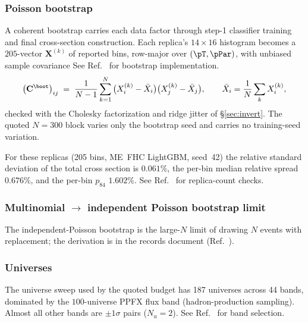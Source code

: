 \subsubsection{Poisson bootstrap}
\label{sec:bootstrap}
A coherent bootstrap carries each data factor through step-1 classifier training and final cross-section construction. Each replica's $14\times16$ histogram becomes a $205$-vector $\mathbf{X}^{(k)}$ of reported bins, row-major over $(\pT,\pPar)$, with unbiased sample covariance See Ref.~\cite{NoteRecords2026} for bootstrap implementation.
\begin{equation}
\big(\mathbf{C}^{\boot}\big)_{ij}
\;=\;
\frac{1}{N-1}\sum_{k=1}^{N}
\big(X_{i}^{(k)} - \bar X_{i}\big)\big(X_{j}^{(k)} - \bar X_{j}\big),
\qquad
\bar X_{i} = \frac{1}{N}\sum_{k} X_{i}^{(k)},
\label{eq:bootcov}
\end{equation}
checked with the Cholesky factorization and ridge jitter of \S\ref{sec:invert}. The quoted $N=300$ block varies only the bootstrap seed and carries no training-seed variation.

For these replicas (205 bins, ME~FHC LightGBM, seed~42) the relative standard deviation of the total cross section is $\boxed{0.061\%}$, the per-bin median relative spread $\boxed{0.676\%}$, and the per-bin $p_{84}$ $1.602\%$. See Ref.~\cite{NoteRecords2026} for replica-count checks.

\subsubsection{Multinomial $\to$ independent Poisson bootstrap limit}
\label{app:poisson}

The independent-Poisson bootstrap is the large-$N$ limit of drawing $N$ events with replacement; the derivation is in the records document (Ref.~\cite{NoteRecords2026}).

\subsubsection{Universes}
\label{sec:universes}
The universe sweep used by the quoted budget has 187 universes across 44 bands, dominated by the $100$-universe PPFX flux band (hadron-production sampling). Almost all other bands are $\pm1\sigma$ pairs ($N_{u}=2$). See Ref.~\cite{NoteRecords2026} for band selection.

